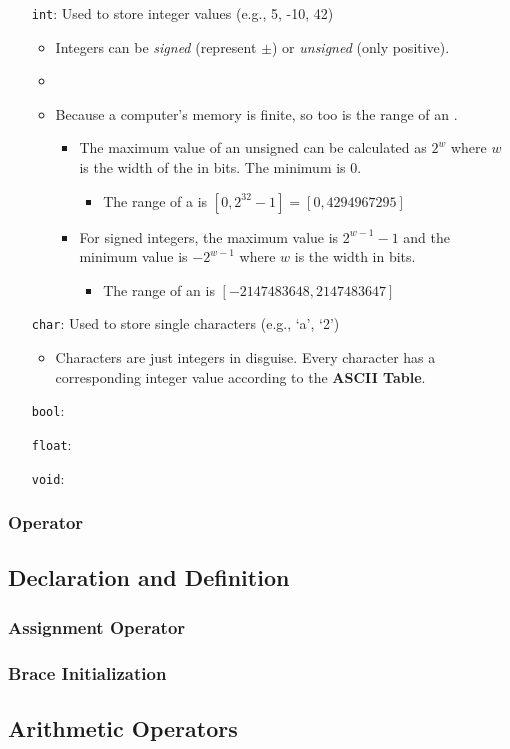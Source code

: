 \documentclass{article}
\begin{document}
\begin{itemize}
	\item[\textcolor{BurntOrange}{\texttt{int}}:] Used to store integer values (e.g., 5, -10, 42)
	\begin{itemize}
		\item Integers can be \textit{signed} (represent $\pm$) or \textit{unsigned} (only positive).
		\item 		
		\item Because a computer's memory is finite, so too is the range of an .
		\begin{itemize}
			\item The maximum value of an unsigned  can be calculated as $2^w$ where $w$ is the width of the  in bits. The minimum is 0.
			\begin{itemize}
				\item The range of a  is $[0, 2^{32}-1]=[0, 4294967295]$
			\end{itemize}
			\item For signed integers, the maximum value is $2^{w-1}-1$ and the minimum value is $-2^{w-1}$ where $w$ is the width in bits.
			\begin{itemize}
				\item The range of an  is $[-2147483648, 2147483647]$
			\end{itemize}
		\end{itemize}
	\end{itemize}
	\item[\textcolor{BurntOrange}{\texttt{char}}:] Used to store single characters (e.g., `a', `2')
	\begin{itemize}
		\item Characters are just integers in disguise. Every character has a corresponding integer value according to the \textbf{ASCII Table}.
	\end{itemize}
	\item[\textcolor{BurntOrange}{\texttt{bool}}:] 
	\item[\textcolor{BurntOrange}{\texttt{float}}:] 
	\item[\textcolor{BurntOrange}{\texttt{void}}:] 
\end{itemize}

\subsubsection{ Operator}

\subsection{Declaration and Definition}

\subsubsection{Assignment Operator \inlinecpp{=}}

\subsubsection{Brace Initialization \inlinecpp{\{\}}}

\subsection{Arithmetic Operators}
\end{document}

